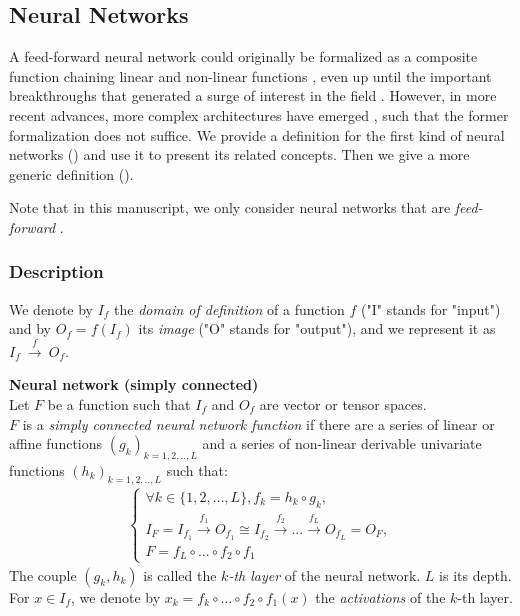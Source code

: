 \subsection{Neural Networks}

A feed-forward neural network could originally be formalized as a composite function chaining linear and non-linear functions \citep{rumelhart1985learning,lecun1989backpropagation,lecun1995convolutional}, even up until the important breakthroughs that generated a surge of interest in the field \citep{hinton2012deep,krizhevsky2012imagenet,simonyan2014very}. However, in more recent advances, more complex architectures have emerged \citep{szegedy2015going,he2016deep,zoph2016neural,huang2017densely}, such that the former formalization does not suffice. We provide a definition for the first kind of neural networks () and use it to present its related concepts. Then we give a more generic definition ().

Note that in this manuscript, we only consider neural networks that are \emph{feed-forward} \citep{zell1994simulation, wiki:fnn}.

\subsubsection{Description}

We denote by $I_f$ the \textit{domain of definition} of a function $f$ ("I" stands for "input") and by $O_f = f(I_f)$ its \textit{image} ("O" stands for "output"), and we represent it as $I_f~\xrightarrow{f}~O_f$.


\begin{definition}\textbf{Neural network (simply connected)}\\
Let $F$ be a function such that $I_f$ and $O_f$ are vector or tensor spaces.\\
$F$ is a \emph{simply connected neural network function} if there are a series of linear or affine functions $(g_k)_{k=1,2,..,L}$ and a series of non-linear derivable univariate functions $(h_k)_{k=1,2,..,L}$ such that:
\begin{gather*}
\left\{
  \begin{array}{l}
    \forall k \in \{1, 2, \ldots, L\}, f_k = h_k \circ g_k, \\
    I_F = I_{f_1} \xrightarrow{f_1} O_{f_1} \cong I_{f_2} \xrightarrow{f_2} \dots \xrightarrow{f_L} O_{f_L} = O_F, \\
    F = f_{L} \circ ... \circ f_{2} \circ f_1
  \end{array}
\right.
\end{gather*}
The couple $(g_k, h_k)$ is called the \emph{$k$-th layer} of the neural network. $L$ is its depth.
For $x \in I_f$, we denote by $x_k = f_k \circ ... \circ f_{2} \circ f_1 (x)$ the \emph{activations} of the $k$-th layer.
\label{def:nn}
\end{definition}

